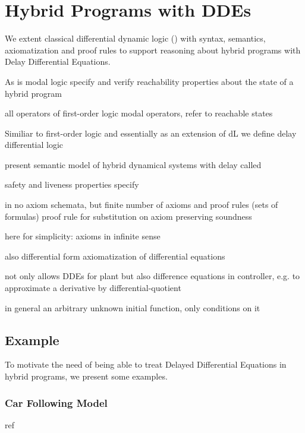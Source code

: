 \chapter{Hybrid Programs with DDEs}\label{hybrid-programs-with-ddes}


We extent classical differential dynamic logic (\dL) with syntax, semantics, axiomatization and proof rules to support reasoning about hybrid programs with Delay Differential Equations.

As \dL
\ddL is modal logic
specify and verify reachability properties about the state of a hybrid program

all operators of first-order logic
modal operators, refer to reachable states

Similiar to first-order logic and essentially as an extension of dL we define delay differential logic

present semantic model
of hybrid dynamical systems with delay
called \dHPs

safety and liveness properties specify

\dL in \cite{Platzer15Uniform} no axiom schemata, but finite number of axioms and proof rules (sets of formulas)
proof rule for substitution on axiom preserving soundness

here for simplicity: axioms in infinite sense

also differential form axiomatization of differential equations

\cite{Platzer12Complete,Platzer15Uniform}

\ddL not only allows DDEs for plant but also difference equations in controller, e.g. to approximate a derivative by differential-quotient

in general an arbitrary unknown initial function, only conditions on it

\section{Example}
    \label{example-hp}

    To motivate the need of being able to treat Delayed Differential Equations in hybrid programs, we present some examples.

    \subsection{Car Following Model}

        ref

